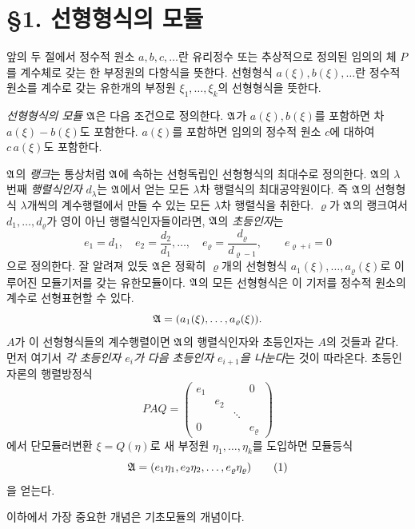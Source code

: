 \section*{\S{}1. 선형형식의 모듈}

앞의 두 절에서 정수적 원소 \(a,b,c,\ldots\)란 유리정수 또는 추상적으로 정의된 임의의 체 \(P\)를 계수체로 갖는 한 부정원의 다항식을 뜻한다. 선형형식 \(a(\xi),b(\xi),\ldots\)란 정수적 원소를 계수로 갖는 유한개의 부정원 \(\xi_1,\ldots,\xi_k\)의 선형형식을 뜻한다.

\emph{선형형식의 모듈 \(\mathfrak A\)}은 다음 조건으로 정의한다. \(\mathfrak A\)가 \(a(\xi),b(\xi)\)를 포함하면 차 \(a(\xi)-b(\xi)\)도 포함한다. \(a(\xi)\)를 포함하면 임의의 정수적 원소 \(c\)에 대하여 \(c\,a(\xi)\)도 포함한다.

\(\mathfrak A\)의 \emph{랭크}는 통상처럼 \(\mathfrak A\)에 속하는 선형독립인 선형형식의 최대수로 정의한다. \(\mathfrak A\)의 \(\lambda\)번째 \emph{행렬식인자} \(d_\lambda\)는 \(\mathfrak A\)에서 얻는 모든 \(\lambda\)차 행렬식의 최대공약원이다. 즉 \(\mathfrak A\)의 선형형식 \(\lambda\)개씩의 계수행렬에서 만들 수 있는 모든 \(\lambda\)차 행렬식을 취한다. \(\varrho\)가 \(\mathfrak A\)의 랭크여서 \(d_1,\ldots,d_\varrho\)가 영이 아닌 행렬식인자들이라면, \(\mathfrak A\)의 \emph{초등인자}는
\[
e_1=d_1,\quad e_2=\frac{d_2}{d_1},\ldots,\quad
e_\varrho=\frac{d_\varrho}{d_{\varrho-1}},\qquad
e_{\varrho+i}=0
\]
으로 정의한다. 잘 알려져 있듯 \(\mathfrak A\)은 정확히 \(\varrho\)개의 선형형식 \(a_1(\xi),\ldots,a_\varrho(\xi)\)로 이루어진 모듈기저를 갖는 유한모듈이다. \(\mathfrak A\)의 모든 선형형식은 이 기저를 정수적 원소의 계수로 선형표현할 수 있다.
\[
\mathfrak A=(a_1(\xi),\ldots,a_\varrho(\xi)).
\]
\(A\)가 이 선형형식들의 계수행렬이면 \(\mathfrak A\)의 행렬식인자와 초등인자는 \(A\)의 것들과 같다. 먼저 여기서 \emph{각 초등인자 \(e_i\)가 다음 초등인자 \(e_{i+1}\)을 나눈다}는 것이 따라온다. 초등인자론의 행렬방정식
\[
PAQ=
\begin{pmatrix}
e_1&&&0\\
&e_2&&\\
&&\ddots&\\
0&&&e_\varrho
\end{pmatrix}
\]
에서 단모듈러변환 \(\xi=Q(\eta)\)로 새 부정원 \(\eta_1,\ldots,\eta_k\)를 도입하면 모듈등식
\begin{equation}
\mathfrak A=(e_1\eta_1,e_2\eta_2,\ldots,e_\varrho\eta_\varrho)
\tag{1}
\end{equation}
을 얻는다.

이하에서 가장 중요한 개념은 기초모듈의 개념이다.

